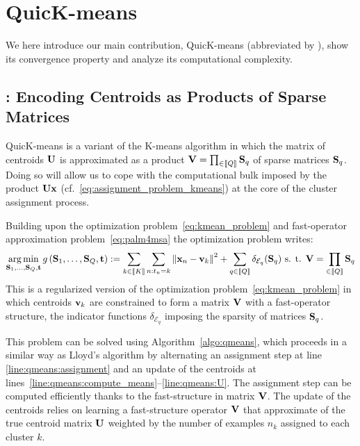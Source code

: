 
\section{QuicK-means}
\label{sec:contribution}

We here introduce our main contribution, QuicK-means (abbreviated by \qkmeans), 
show its convergence property and analyze its computational complexity.

\subsection{\qkmeans: Encoding Centroids as Products of Sparse Matrices}

QuicK-means is a variant of the K-means algorithm in which the matrix of centroids ${\mathbf{U}}$
is approximated as a product ${\mathbf{V}}=\prod_{\in\left \llbracket Q\right \rrbracket}{\mathbf{S}}_q$ of sparse matrices ${\mathbf{S}}_q$.
Doing so will allow us to cope with the computational bulk imposed by the product ${\mathbf{U}}{\mathbf{x}}$
(cf.~\eqref{eq:assignment_problem_kmeans}) at the core of the cluster assignment process.

Building upon the \kmeans optimization problem~\eqref{eq:kmean_problem} and fast-operator approximation problem~\eqref{eq:palm4msa} the \qkmeans optimization problem 
writes:
%
\begin{align}
\label{eq:qmean_problem}
 \operatorname*{arg\,min}_{{\mathbf{S}}_1, \ldots, {\mathbf{S}}_{Q}, {\mathbf{t}}} g\left({\mathbf{S}}_1, \ldots, {\mathbf{S}}_{Q}, {\mathbf{t}}\right)
    := \sum_{k\in\left \llbracket K\right \rrbracket}\sum_{n: t_n = k} \left\|{\mathbf{x}}_n -{\mathbf{v}}_k\right\|^2 + \sum_{q\in\left \llbracket Q\right \rrbracket} \delta_{\mathcal{E}_q}({\mathbf{S}}_q) \text{ s. t. } {\mathbf{V}} = \prod_{\in\left \llbracket Q\right \rrbracket}{\mathbf{S}}_q
\end{align}
%
This is a regularized version of the \kmeans optimization problem~\eqref{eq:kmean_problem} in which centroids ${\mathbf{v}}_k$ are constrained to form a matrix ${\mathbf{V}}$ with a fast-operator structure, the indicator functions $\delta_{\mathcal{E}_q}$ imposing the sparsity of matrices ${\mathbf{S}}_q$.


This problem can be solved using Algorithm~\ref{algo:qmeans},
which proceeds in a similar way as Lloyd's algorithm by alternating an assignment step at line \ref{line:qmeans:assignment} and an update of the centroids at lines~\ref{line:qmeans:compute_means}--\ref{line:qmeans:U}. The assignment step can be computed efficiently thanks to the fast-structure in matrix ${\mathbf{V}}$. The update of the centroids relies on learning a fast-structure operator ${\mathbf{V}}$ that approximate of the true centroid matrix ${\mathbf{U}}$ weighted by the number of examples $n_k$ assigned to each cluster $k$.

